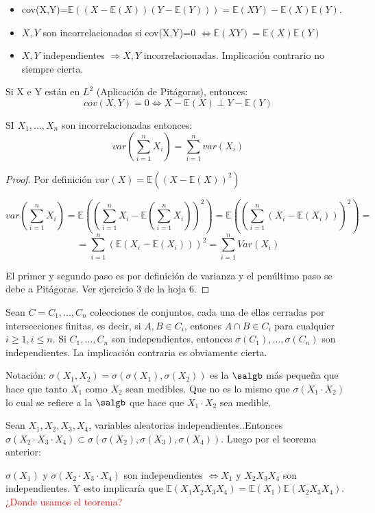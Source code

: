 \documentclass{apuntes}
\begin{document}
\begin{defn}
\begin{itemize}

\item cov(X,Y)=$\mathbb{E}((X-\mathbb{E}(X))(Y-\mathbb{E}(Y)))=\mathbb{E}(XY)-\mathbb{E}(X)\mathbb{E}(Y)$.

\item$X,Y$ son incorrelacionadas si cov(X,Y)=0 $\Leftrightarrow \mathbb{E}(XY)=\mathbb{E}(X)\mathbb{E}(Y) $

\item$X,Y$ independientes $\Rightarrow X,Y$ incorrelacionadas. Implicación contrario no siempre cierta.
\end{itemize}
\end{defn}

\obs Si X e Y están en $L^2$ (Aplicación de Pitágoras), entonces:
\[
cov(X,Y)=0 \Leftrightarrow X-\mathbb{E}(X) \perp Y - \mathbb{E}(Y)
\]

\obs SI $X_1,...,X_n$ son incorrelacionadas entonces:
\[
var(\sum_{i=1}^{n} X_i) = \sum_{i=1}^{n}var(X_i)
\]
\begin{proof}
Por definición $var(X)=\mathbb{E}((X-\mathbb{E}(X))^2)$

\[
var(\sum_{i=1}^{n} X_i) = \mathbb{E}\left((\sum_{i=1}^{n} X_i  -\mathbb{E}(\sum_{i=1}^{n}X_i))^2\right) = \mathbb{E}\left((\sum_{i=1}^{n} (X_i  -\mathbb{E}(X_i)))^2\right) =
\]
\[
= \sum_{i=1}^{n}( \mathbb{E}(X_i  -\mathbb{E}(X_i)))^2= \sum_{i=1}^{n} Var(X_i)
\]

El primer y segundo paso es por definición de varianza y el penúltimo paso se debe a Pitágoras. Ver ejercicio 3 de la hoja 6.
\end{proof}

\begin{theorem}
Sean $C=C_1,...,C_n$ colecciones de conjuntos, cada una de ellas cerradas por intersecciones finitas, es decir, si $A,B \in C_i$, entones $A \cap B \in C_i$ para cualquier $i\geq1 , i \leq n$. Si $C_1,...,C_n$ son independientes, entonces $\sigma(C_1),...,\sigma(C_n)$ son independientes. La implicación contraria es obviamente cierta.
\end{theorem}

Notación: $\sigma(X_1,X_2)=\sigma(\sigma(X_1),\sigma(X_2))$  es la $\salgb$ más pequeña que hace que tanto $X_1$ como $X_2$ sean medibles. Que no es lo mismo que $\sigma(X_1\cdot X_2)$ lo cual se refiere a la $\salgb$ que hace que $X_1\cdot X_2$ sea medible.

\begin{example}
Sean $X_1, X_2, X_3, X_4$, variables aleatorias independientes..Entonces $\sigma(X_2 \cdot X_3 \cdot X_4) \subset \sigma(\sigma(X_2),\sigma(X_3),\sigma(X_4))$. Luego por el teorema anterior:

$\sigma(X_1)$ y $\sigma(X_2 \cdot X_3 \cdot X_4)$ son independientes $\Leftrightarrow X_1 \text{ y } X_2X_3X_4$ son independientes. Y esto implicaría que $\mathbb{E}(X_1X_2X_3X_4)=\mathbb{E}(X_1)\mathbb{E}(X_2X_3X_4)$. \textcolor{red}{¿Donde usamos el teorema?}
\end{example}
\end{document}
